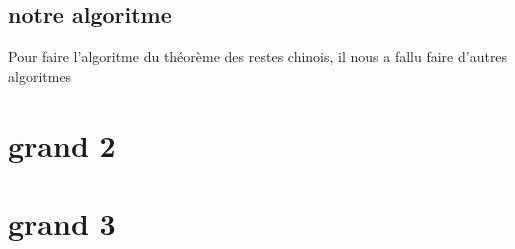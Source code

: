 \documentclass[a4paper, 11pt]{article}
\begin{document}
\subsection{notre algoritme}
Pour faire l'algoritme du théorème des restes chinois, il nous a fallu faire d'autres algoritmes

\newpage
\section{grand 2}

\newpage
\section{grand 3}
\end{document}
